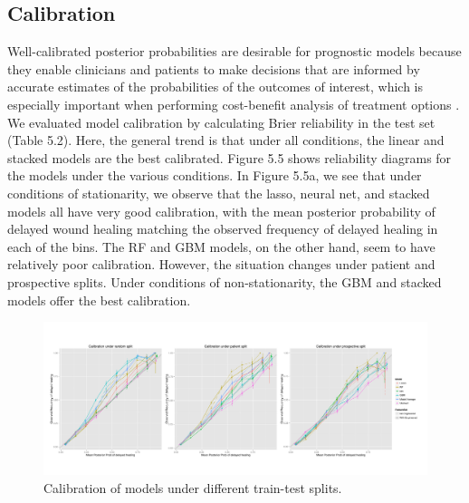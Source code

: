\subsection{Calibration}
Well-calibrated posterior probabilities are desirable for prognostic
models because they enable clinicians and patients to make decisions
that are informed by accurate estimates of the probabilities of the
outcomes of interest, which is especially important when performing
cost-benefit analysis of treatment options
\cite{Cook2007,Cook2008}. We evaluated model calibration by
calculating Brier reliability in the test set (Table 5.2). Here, the
general trend is that under all conditions, the linear and stacked
models are the best calibrated.  Figure 5.5 shows reliability diagrams
for the models under the various conditions.  In Figure 5.5a, we see
that under conditions of stationarity, we observe that the lasso,
neural net, and stacked models all have very good calibration, with
the mean posterior probability of delayed wound healing matching the
observed frequency of delayed healing in each of the bins.  The RF and
GBM models, on the other hand, seem to have relatively poor
calibration.  However, the situation changes under patient and
prospective splits.  Under conditions of non-stationarity, the GBM and
stacked models offer the best calibration.

\begin{figure}
  \begin{center}
    \includegraphics[width=0.9\linewidth]{ch5-figures/calibration.pdf}
  \end{center}
  \caption{Calibration of models under different train-test splits.}
  \label{fig:short}
\end{figure}


